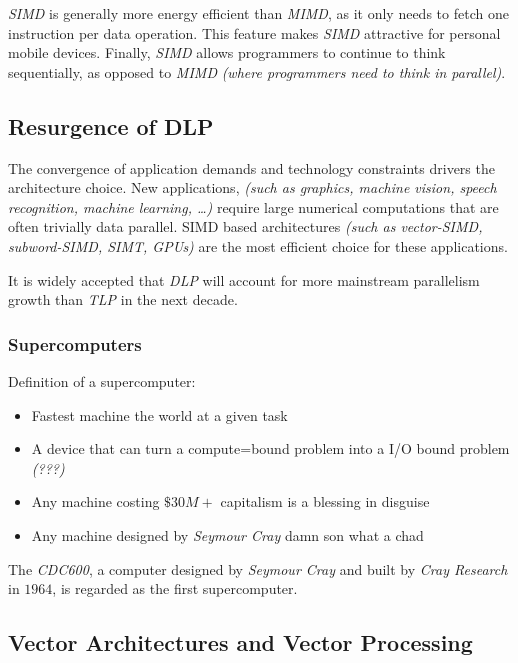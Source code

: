\documentclass[english]{article}
\begin{document}
\textit{SIMD} is generally more energy efficient than \textit{MIMD}, as it only needs to fetch one instruction per data operation.
This feature makes \textit{SIMD} attractive for personal mobile devices.
Finally, \textit{SIMD} allows programmers to continue to think sequentially, as opposed to \textit{MIMD} \textit{(where programmers need to think in parallel)}.

\subsection{Resurgence of DLP}

The convergence of application demands and technology constraints drivers the architecture choice.
New applications, \textit{(such as graphics, machine vision, speech recognition, machine learning, \ldots)} require large numerical computations that are often trivially data parallel.
SIMD based architectures \textit{(such as vector-SIMD, subword-SIMD, SIMT, GPUs)} are the most efficient choice for these applications.

It is widely accepted that \textit{DLP} will account for more mainstream parallelism growth than \textit{TLP} in the next decade.

\subsubsection{Supercomputers}

Definition of a supercomputer:

\begin{itemize}
  \item Fastest machine the world at a given task
  \item A device that can turn a compute=bound problem into a I/O bound problem \textit{(???)}
  \item Any machine costing \(\$30M+\) {\tiny capitalism is a blessing in disguise}
  \item Any machine designed by \textit{Seymour Cray} {\tiny damn son what a chad}
\end{itemize}

The \textit{CDC600}, a computer designed by \textit{Seymour Cray} and built by \textit{Cray Research} in \(1964\), is regarded as the first supercomputer.

\subsection{Vector Architectures and Vector Processing}
\end{document}
